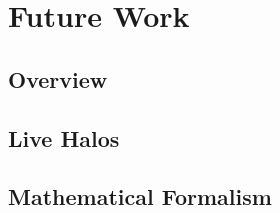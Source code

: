 \chapter{Future Work}

\section{Overview}


\section{Live Halos}


\section{Mathematical Formalism}


